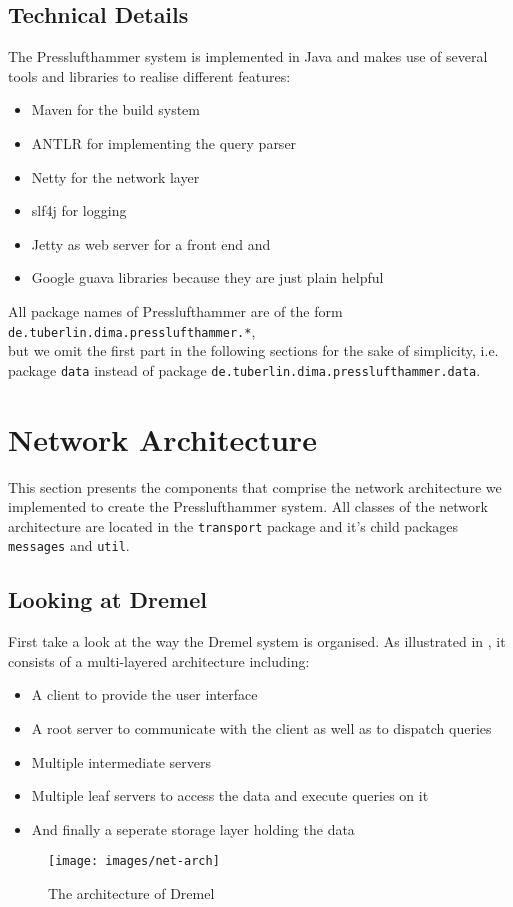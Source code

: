 \subsection{Technical Details}
The Presslufthammer system is implemented in Java and makes use of several tools
and libraries to realise different features:

\begin{itemize}
  \item Maven \cite{maven} for the build system
  \item ANTLR \cite{antlr} for implementing the query parser
  \item Netty \cite{netty} for the network layer
  \item slf4j \cite{slf4j} for logging
  \item Jetty \cite{jetty} as web server for a front end and
  \item Google guava libraries \cite{guava} because they are just plain helpful
\end{itemize}

All package names of Presslufthammer are of the form\\
\texttt{de.tuberlin.dima.presslufthammer.*},\\
but we omit the first part in the following sections for the sake of simplicity,
i.e. package \texttt{data} instead of package
\texttt{de.tuberlin.dima.presslufthammer.data}.

\section{Network Architecture}
  This section presents the components that comprise the network architecture
  we implemented to create the Presslufthammer system.
  All classes of the network architecture are located in the \texttt{transport}
  package and it's child packages \texttt{messages} and \texttt{util}.
  
  
  \subsection{Looking at Dremel}
    First take a look at the way the Dremel \cite{melnik2010dremel} system is
    organised.
    As illustrated in , it consists of a multi-layered architecture including:
    \begin{itemize}
      \item A client to provide the user interface
      \item A root server to communicate with the client as well as to dispatch
        queries
      \item Multiple intermediate servers
      \item Multiple leaf servers to access the data and execute queries on it
      \item And finally a seperate storage layer holding the data
    \end{itemize}
    \begin{figure}[ht]
      \centering
      \texttt{[image: images/net-arch]}
      \caption{The architecture of Dremel\cite{melnik2010dremel}}
      \label{fig:netarch}
    \end{figure}


